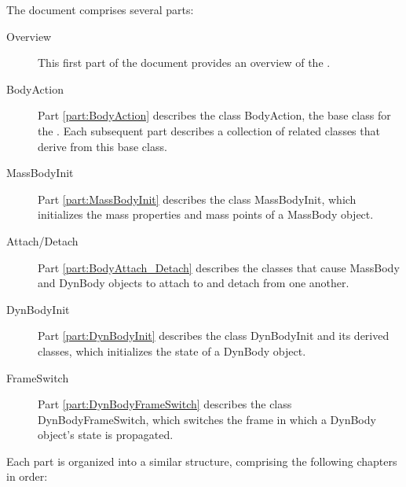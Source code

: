 The document comprises several parts:
\begin{description}
\item[Overview]
This first part of the document provides an
overview of the \ModelDesc.
\item[BodyAction]
Part \ref{part:BodyAction} describes the class BodyAction, the
base class for the \ModelDesc.
Each subsequent part describes a collection of related classes
that derive from this base class.
\item[MassBodyInit]
Part \ref{part:MassBodyInit} describes the class MassBodyInit, which
initializes the mass properties and mass points of a MassBody object.
\item[Attach/Detach]
Part \ref{part:BodyAttach_Detach} describes the classes that cause
MassBody and DynBody objects to attach to and detach from one another.
\item[DynBodyInit]
Part \ref{part:DynBodyInit} describes the class DynBodyInit and its
derived classes, which initializes the state of a DynBody object.
\item[FrameSwitch]
Part \ref{part:DynBodyFrameSwitch} describes the class DynBodyFrameSwitch,
which switches the frame in which a DynBody object's state is propagated.
\end{description}

Each part is organized into a similar structure, comprising the following
chapters in order:

